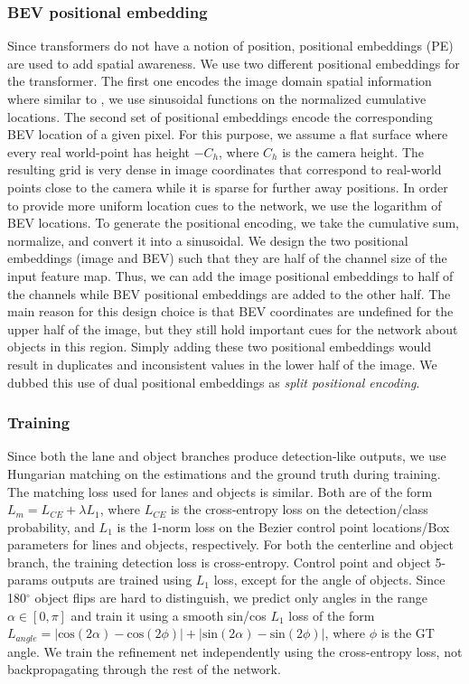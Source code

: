 \documentclass[10pt,twocolumn,letterpaper]{article}
\begin{document}
\subsubsection{BEV positional embedding}
Since transformers do not have a notion of position, positional embeddings (PE) are used to add spatial awareness. We use two different positional embeddings for the transformer. The first one encodes the image domain spatial information where similar to \cite{DBLP:conf/eccv/CarionMSUKZ20}, we use sinusoidal functions on the normalized cumulative locations. The second set of positional embeddings encode the corresponding BEV location of a given pixel. For this purpose, we assume a flat surface where every real world-point has height $-C_h$, where $C_h$ is the camera height. The resulting grid is very dense in image coordinates that correspond to real-world points close to the camera while it is sparse for further away positions. In order to provide more uniform location cues to the network, we use the logarithm of BEV locations. To generate the positional encoding, we take the cumulative sum, normalize, and convert it into a sinusoidal. We design the two positional embeddings (image and BEV) such that they are half of the channel size of the input feature map. Thus, we can add the image positional embeddings to half of the channels while BEV positional embeddings are added to the other half. The main reason for this design choice is that BEV coordinates are undefined for the upper half of the image, but they still hold important cues for the network about objects in this region. Simply adding these two positional embeddings would result in duplicates and inconsistent values in the lower half of the image. We dubbed this use of dual positional embeddings as \emph{split positional encoding}.    


\subsubsection{Training}
Since both the lane and object branches produce detection-like outputs, we use Hungarian matching on the estimations and the ground truth during training. The matching loss used for lanes and objects is similar. Both are of the form $L_{m} = L_{CE} + \lambda L_1$, where $L_{CE}$ is the cross-entropy loss on the detection/class probability, and $L_1$ is the 1-norm loss on the Bezier control point locations/Box parameters for lines and objects, respectively. For both the centerline and object branch, the training detection loss is cross-entropy.
Control point and object 5-params outputs are trained using $L_1$ loss, except for the angle of objects. Since 180$^\circ$ object flips are hard to distinguish, we predict only angles in the range $\alpha \in [0,\pi]$ and train it using a smooth sin/cos $L_1$ loss of the form $L_{angle}=|\text{cos}(2\alpha) - \text{cos}(2\phi)| + |\text{sin}(2\alpha) - \text{sin}(2\phi)|$, where $\phi$ is the GT angle. We train the refinement net independently using the cross-entropy loss, not backpropagating through the rest of the network. 
\end{document}
